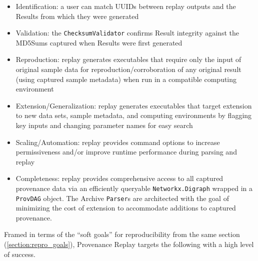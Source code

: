 \begin{itemize}
    \item Identification: a user can match UUIDs between replay outputs and the
        Results from which they were generated
    \item Validation: the \texttt{ChecksumValidator} confirms Result integrity
        against the MD5Sums captured when Results were first generated
    \item Reproduction: replay generates executables that require only the input
        of original sample data for reproduction/corroboration of any original
        result (using captured sample metadata) when run in a compatible computing
        environment
    \item Extension/Generalization: replay generates executables that target
        extension to new data sets, sample metadata, and computing environments by
        flagging key inputs and changing parameter names for easy search
    \item Scaling/Automation: replay provides command options to increase
        permissiveness and/or improve runtime performance during parsing and replay
    \item Completeness: replay provides comprehensive access to all captured
        provenance data via an efficiently queryable \texttt{Networkx.Digraph}
        wrapped in a \texttt{ProvDAG} object. The Archive \texttt{Parser}s are architected
        with the goal of minimizing the cost of extension to accommodate additions
        to captured provenance.
\end{itemize}

Framed in terms of the “soft goals” for reproducibility from the same section (\ref{section:repro_goals}),
Provenance Replay targets the following with a high level of success.

